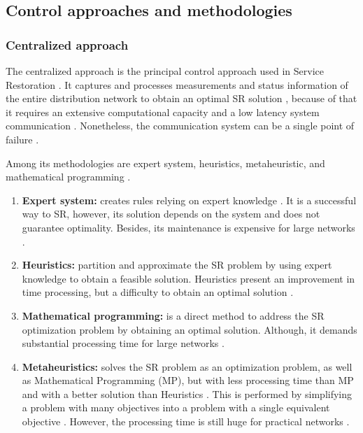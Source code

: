 \subsection{Control approaches and methodologies}
\label{ch-literature:sec-sr:approaches}
\subsubsection*{Centralized approach}
The centralized approach is the principal control approach used in Service Restoration \cite{Abu-Elanien2018}. 
It captures and processes measurements and status information of the entire distribution network to obtain 
an optimal 
SR solution \cite{Koch-Ciobotaru2014}, because of that it requires an extensive computational capacity and a low latency system 
communication \cite{Zidan2017} \cite{Shen2018}. 
Nonetheless, the communication system can be a single point of failure \cite{Shen2018}. 

Among its methodologies are expert system, heuristics, metaheuristic, and mathematical programming 
\cite{Chellaswamy2019}. 



\begin{enumerate}
    \item \textbf{Expert system:} creates rules relying on expert knowledge \cite{Shen2018}. 
    It is a successful way to SR, however, its solution depends on the system and does not guarantee 
    optimality. Besides, its maintenance is expensive for large networks \cite{Zidan2017} \cite{Shen2018}. 
    \item \textbf{Heuristics:} partition and approximate the SR problem by 
    using expert knowledge to obtain a feasible solution. Heuristics present an improvement in time 
    processing, but a difficulty to obtain an optimal solution \cite{Abu-Elanien2018}\cite{Shen2018}. 
    \item \textbf{Mathematical programming:} is a direct method to address the SR optimization problem 
    by obtaining an optimal solution. Although, it demands substantial processing time for large networks
    \cite{Abu-Elanien2018}. 
    \item \textbf{Metaheuristics:} solves the SR problem as an optimization problem, as well as Mathematical Programming (MP),  
    but with less processing time than MP and with a better solution than Heuristics \cite{Abu-Elanien2018}. 
    This is performed by simplifying a problem with many objectives into a problem with a single equivalent objective \cite{Shen2018}. 
     However, the processing time is still huge for practical networks \cite{Zidan2017}. 
\end{enumerate}

